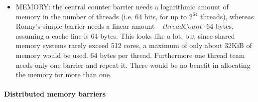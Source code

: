 \documentclass[a4paper, 10pt]{article}
\begin{document}
\begin{itemize}
	\item MEMORY: the central counter barrier needs a logarithmic amount of memory in the number of threads (i.e. 64 bits, for up to $2^{64}$ threads), whereas Ronny's simple barrier needs a linear amount -- $\mathit{threadCount} \cdot 64$ bytes, assuming a cache line is 64 bytes. This looks like a lot, but since shared memory systems rarely exceed 512 cores, a maximum of only about 32KiB of memory would be used. 64 bytes per thread. Furthermore one thread team needs only one barrier and repeat it. There would be no benefit in allocating the memory for more than one.
\end{itemize}

\paragraph{Distributed memory barriers}
\label{sssec:analysis-general-distributed}
\end{document}
